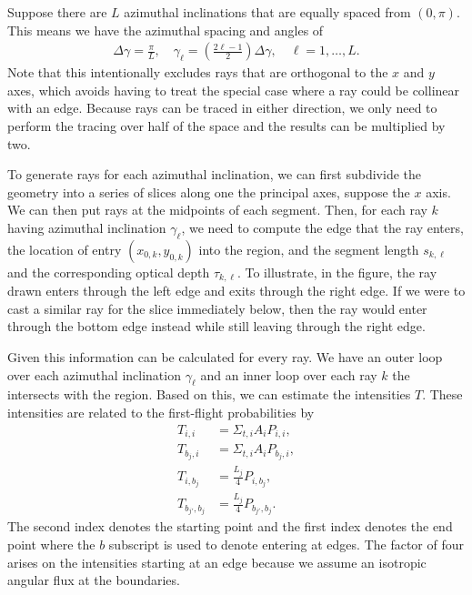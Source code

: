 Suppose there are $L$ azimuthal inclinations that are equally spaced from $(0,\pi)$. This means we have the azimuthal spacing and angles of
\begin{align}
  \Delta \gamma = \frac{\pi}{L}, \quad \gamma_\ell = \left( \frac{ 2\ell - 1 }{2} \right) \Delta \gamma , \quad \ell = 1, \ldots, L .
\end{align}
Note that this intentionally excludes rays that are orthogonal to the $x$ and $y$ axes, which avoids having to treat the special case where a ray could be collinear with an edge. Because rays can be traced in either direction, we only need to perform the tracing over half of the space and the results can be multiplied by two.

To generate rays for each azimuthal inclination, we can first subdivide the geometry into a series of slices along one the principal axes, suppose the $x$ axis. We can then put rays at the midpoints of each segment. Then, for each ray $k$ having azimuthal inclination $\gamma_\ell$, we need to compute the edge that the ray enters, the location of entry $(x_{0,k},y_{0,k})$ into the region, and the segment length $s_{k,\ell}$ and the corresponding optical depth $\tau_{k,\ell}$. To illustrate, in the figure, the ray drawn enters through the left edge and exits through the right edge. If we were to cast a similar ray for the slice immediately below, then the ray would enter through the bottom edge instead while still leaving through the right edge.

Given this information can be calculated for every ray. We have an outer loop over each azimuthal inclination $\gamma_\ell$ and an inner loop over each ray $k$ the intersects with the region. Based on this, we can estimate the intensities $T$. These intensities are related to the first-flight probabilities by
\begin{subequations}
\begin{align}
  T_{i,i}   	 &= \Sigma_{t,i} A_i P_{i,i} , \\
  T_{b_j,i} 	 &= \Sigma_{t,i} A_i P_{b_j,i} , \\
  T_{i,b_j}      &= \frac{L_j}{4} P_{i,b_j}, \\
  T_{b_{j'},b_j} &= \frac{L_j}{4} P_{b_{j'},b_j} . 
\end{align}
\end{subequations}
The second index denotes the starting point and the first index denotes the end point where the $b$ subscript is used to denote entering at edges. The factor of four arises on the intensities starting at an edge because we assume an isotropic angular flux at the boundaries.

